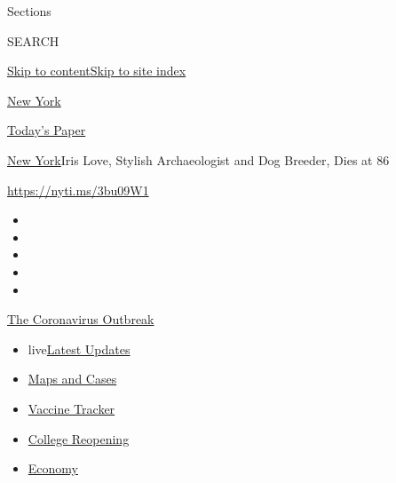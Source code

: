 Sections

SEARCH

\protect\hyperlink{site-content}{Skip to
content}\protect\hyperlink{site-index}{Skip to site index}

\href{https://www.nytimes.com/section/nyregion}{New York}

\href{https://myaccount.nytimes.com/auth/login?response_type=cookie\&client_id=vi}{}

\href{https://www.nytimes.com/section/todayspaper}{Today's Paper}

\href{/section/nyregion}{New York}\textbar{}Iris Love, Stylish
Archaeologist and Dog Breeder, Dies at 86

\url{https://nyti.ms/3bu09W1}

\begin{itemize}
\item
\item
\item
\item
\item
\end{itemize}

\href{https://www.nytimes.com/news-event/coronavirus?action=click\&pgtype=Article\&state=default\&region=TOP_BANNER\&context=storylines_menu}{The
Coronavirus Outbreak}

\begin{itemize}
\tightlist
\item
  live\href{https://www.nytimes.com/2020/08/03/world/coronavirus-covid-19.html?action=click\&pgtype=Article\&state=default\&region=TOP_BANNER\&context=storylines_menu}{Latest
  Updates}
\item
  \href{https://www.nytimes.com/interactive/2020/us/coronavirus-us-cases.html?action=click\&pgtype=Article\&state=default\&region=TOP_BANNER\&context=storylines_menu}{Maps
  and Cases}
\item
  \href{https://www.nytimes.com/interactive/2020/science/coronavirus-vaccine-tracker.html?action=click\&pgtype=Article\&state=default\&region=TOP_BANNER\&context=storylines_menu}{Vaccine
  Tracker}
\item
  \href{https://www.nytimes.com/2020/08/02/us/covid-college-reopening.html?action=click\&pgtype=Article\&state=default\&region=TOP_BANNER\&context=storylines_menu}{College
  Reopening}
\item
  \href{https://www.nytimes.com/live/2020/08/03/business/stock-market-today-coronavirus?action=click\&pgtype=Article\&state=default\&region=TOP_BANNER\&context=storylines_menu}{Economy}
\end{itemize}

